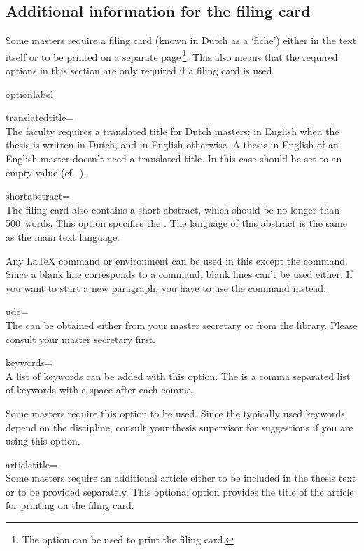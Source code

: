 \subsection{Additional information for the filing card}
Some masters require a filing card (known in Dutch as a
`\foreignlanguage{dutch}{fiche}') either in the text itself or to be
printed on a separate page\,\footnote{The option 
  can be used to print the filing card.}. This also means that the required
options in this section are only required if a filing card is used. 
\begin{labelled}{optionlabel}
\item[translatedtitle=\meta{title2\,}]
  \\
  The faculty requires a translated title  for Dutch
  masters: in English when the thesis is written in Dutch, and in English
  otherwise. A thesis in English of an English master doesn't need a
  translated title. In this case  should be set to an empty
  value (cf.\ ).

\item[shortabstract=\meta{short abstract}]
  \\
  The filing card also contains a short abstract, which should be no longer
  than 500~words. This option specifies the . The
  language of this abstract is the same as the main text language.

  Any LaTeX command or environment can be used in this  except the  command. Since a blank line corresponds
  to a  command, blank lines can't be used either. If you want to
  start a new paragraph, you have to use the  command instead.

\item[udc=\meta{UDC nr}]\\
  The can be obtained either from your master secretary or
  from the library. Please consult your master secretary first.

\item[keywords=\meta{keywordlist}]\\
  A list of keywords can be added with this option. The 
  is a comma separated list of keywords with a space after each comma.

  Some masters require this option to be used. Since the typically used
  keywords depend on the discipline, consult your thesis supervisor for
  suggestions if you are using this option.

\item[articletitle=\meta{arttitle}]\\
  Some masters require an additional article either to be included in the
  thesis text or to be provided separately. This optional option provides
  the title  of the article for printing on the filing card.
\end{labelled}

